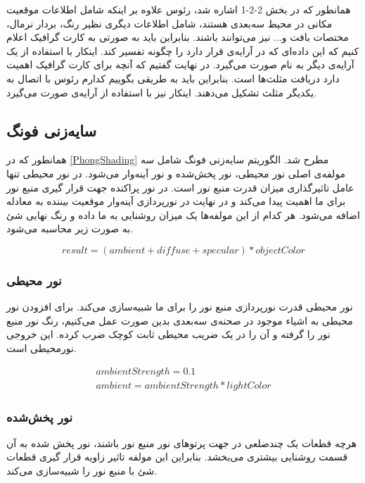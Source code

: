 همانطور که در بخش  2-2-1
اشاره شد، رئوس علاوه بر اینکه شامل اطلاعات موقعیت مکانی در محیط سه‌بعدی هستند، شامل اطلاعات دیگری 
نظیر رنگ، بردار نرمال، مختصات بافت  و... نیز می‌توانند باشند. بنابراین باید به صورتی به کارت گرافیک 
اعلام کنیم که این داده‌ای که در آرایه‌ی 
قرار دارد را چگونه تفسیر کند.
اینکار با استفاده از یک آرایه‌ی دیگر به نام 
صورت می‌گیرد.
در نهایت گفتیم که آنچه برای کارت گرافیک اهمیت دارد دریافت مثلث‌ها است. بنابراین باید به طریقی بگوییم کدارم رئوس با 
اتصال به یکدیگر مثلث تشکیل می‌دهند. اینکار نیز با استفاده از آرایه‌ی 
صورت می‌گیرد.

\subsection{سایه‌زنی فونگ}
همانطور که در 
\ref{PhongShading}
مطرح شد. الگوریتم سایه‌زنی فونگ شامل سه مولفه‌ی اصلی 
نور محیطی، نور پخش‌شده و نور آینه‌وار می‌شود.
در نور محیطی تنها عامل تاثیرگذاری میزان قدرت منبع نور است.
در نور پراکنده جهت قرار گیری منبع نور برای ما اهمیت پیدا می‌کند و در نهایت 
در نورپردازی آینه‌وار موقعیت بیننده به معادله اضافه می‌شود.
هر کدام از این مولفه‌ها یک میزان روشنایی به ما داده و 
رنگ نهایی شئ به صورت زیر محاسبه می‌شود.

\[ result = (ambient + diffuse + specular) * objectColor \]

\subsubsection{نور محیطی}
نور محیطی قدرت نورپردازی منبع نور را برای ما شبیه‌سازی می‌کند.
برای افزودن نور محیطی به اشیاء موجود در صحنه‌ی سه‌بعدی بدین صورت عمل 
می‌کنیم، رنگ نور منبع نور را گرفته و آن را در یک ضریب محیطی 
ثابت کوچک ضرب کرده. این خروجی نورمحیطی
است.

\begin{gather*}
	ambientStrength = 0.1 \\
	ambient = ambientStrength * lightColor
\end{gather*}


\subsubsection{نور پخش‌شده}

هرچه قطعات یک چندضلعی در جهت پرتو‌های نور منبع نور باشند، نور پخش شده 
به آن قسمت روشنایی بیشتری می‌بخشد.
بنابراین این مولفه تاثیر زاویه قرار گیری قطعات شئ با منبع نور را شبیه‌سازی می‌کند.

